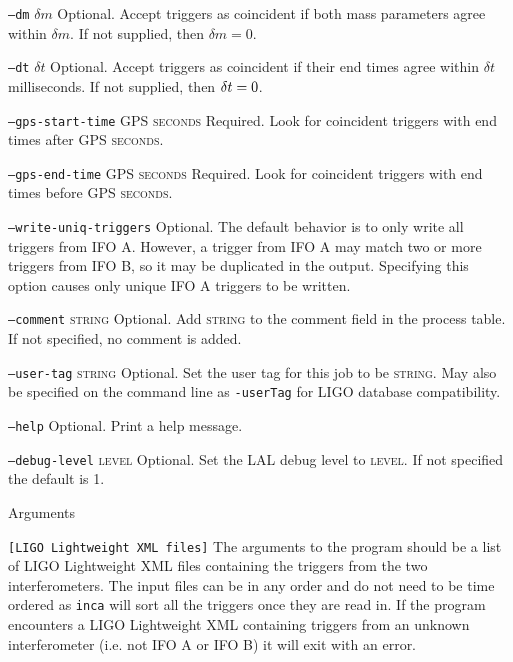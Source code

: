 \begin{entry}
\begin{entry}
\item[\texttt{--dm} \textsc{$\delta m$}] Optional. Accept triggers as
coincident if both mass parameters agree within $\delta m$.  If not
supplied,  then $\delta m = 0$.

\item[\texttt{--dt} \textsc{$\delta t$}] Optional. Accept triggers as
coincident if their end times agree within $\delta t$ milliseconds.  If not
supplied,  then $\textsc{$\delta t$} = 0$.

\item[\texttt{--gps-start-time} \textsc{GPS seconds}] Required.  Look for
coincident triggers with end times after \textsc{GPS seconds}.

\item[\texttt{--gps-end-time} \textsc{GPS seconds}] Required.  Look for
coincident triggers with end times before \textsc{GPS seconds}.

\item[\texttt{--write-uniq-triggers}] Optional.  The default behavior is to
only write all triggers from IFO A. However, a trigger from IFO A
may match two or more triggers from IFO B, so it may be duplicated in the 
output. Specifying this option causes only unique IFO A triggers to be
written.

\item[\texttt{--comment} \textsc{string}] Optional. Add \textsc{string} to the
comment field in the process table. If not specified, no comment is added. 

\item[\texttt{--user-tag} \textsc{string}] Optional. Set the user tag for this
job to be \textsc{string}. May also be specified on the command line as 
\texttt{-userTag} for LIGO database compatibility.

\item[\texttt{--help}] Optional.  Print a help message.
\end{entry}

\item[\texttt{--debug-level} \textsc{level}] Optional. Set the LAL debug
level to \textsc{level}. If not specified the default is 1.

\item[Arguments]\leavevmode
\begin{entry}
\item[\texttt{[LIGO Lightweight XML files]}] The arguments to the program
should be a list of LIGO Lightweight XML files containing the triggers from
the two interferometers. The input files can be in any order and do not need
to be time ordered as \texttt{inca} will sort all the triggers once they are
read in. If the program encounters a LIGO Lightweight XML containing triggers
from an unknown interferometer (i.e. not IFO A or IFO B) it will exit with an
error.
\end{entry}


\end{entry}
